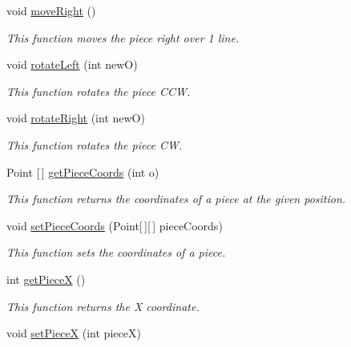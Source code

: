 \begin{DoxyCompactItemize}
void \hyperlink{class_project_tetris_1_1_group11_1_1_model_1_1_piece_ac2d30f3f8e7bb4f156b590ba41a1c24b}{move\+Right} ()
\begin{DoxyCompactList}\small\item\em This function moves the piece right over 1 line. \end{DoxyCompactList}\item 
void \hyperlink{class_project_tetris_1_1_group11_1_1_model_1_1_piece_a49a8a87f2d7265970cda241bb0740106}{rotate\+Left} (int newO)
\begin{DoxyCompactList}\small\item\em This function rotates the piece C\+CW. \end{DoxyCompactList}\item 
void \hyperlink{class_project_tetris_1_1_group11_1_1_model_1_1_piece_a9ec88cace1726a50873efb97a8ec84fb}{rotate\+Right} (int newO)
\begin{DoxyCompactList}\small\item\em This function rotates the piece CW. \end{DoxyCompactList}\item 
Point \mbox{[}$\,$\mbox{]} \hyperlink{class_project_tetris_1_1_group11_1_1_model_1_1_piece_ad8329552a5f8d91046075dca5d8897fd}{get\+Piece\+Coords} (int o)
\begin{DoxyCompactList}\small\item\em This function returns the coordinates of a piece at the given position. \end{DoxyCompactList}\item 
void \hyperlink{class_project_tetris_1_1_group11_1_1_model_1_1_piece_aba9188db14387a600e902dadd2d20332}{set\+Piece\+Coords} (Point\mbox{[}$\,$\mbox{]}\mbox{[}$\,$\mbox{]} piece\+Coords)
\begin{DoxyCompactList}\small\item\em This function sets the coordinates of a piece. \end{DoxyCompactList}\item 
int \hyperlink{class_project_tetris_1_1_group11_1_1_model_1_1_piece_a018dce64b98650107e8871e23dd1e152}{get\+PieceX} ()
\begin{DoxyCompactList}\small\item\em This function returns the X coordinate. \end{DoxyCompactList}\item 
void \hyperlink{class_project_tetris_1_1_group11_1_1_model_1_1_piece_a5ea3a78cfb66a1609cf259f9e624dfcb}{set\+PieceX} (int pieceX)

\end{DoxyCompactItemize}
